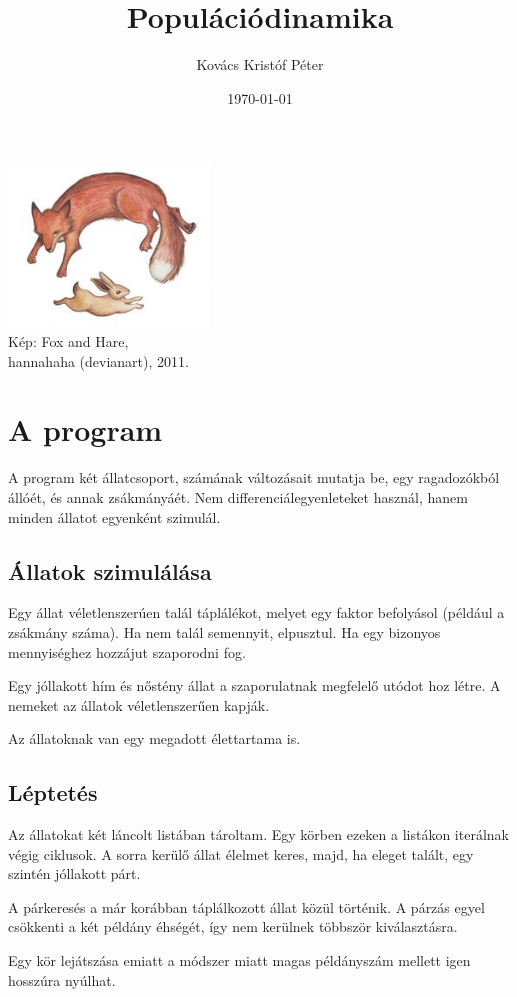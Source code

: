 \documentclass[twoside]{article}
\title{Populációdinamika}
\date{\today}
\author{Kovács Kristóf Péter}
\begin{document}
	
	\maketitle
	\thispagestyle{empty}
	\begin{center}
		\includegraphics[width = 0.4\textwidth]{fox_n_rabbits}
		\\
		\tiny{Kép: Fox and Hare,
		\\hannahaha (devianart), 2011.}
	\end{center}
	\pagebreak
	\section*{A program}
		A program két állatcsoport, számának változásait mutatja be, egy ragadozókból állóét, és annak zsákmányáét. Nem differenciálegyenleteket használ, hanem minden állatot egyenként szimulál.
		\subsection*{Állatok szimulálása}
			Egy állat véletlenszerúen talál táplálékot, melyet egy faktor befolyásol (például a zsákmány száma). Ha nem talál semennyit, elpusztul. Ha egy bizonyos mennyiséghez hozzájut szaporodni fog.
			\par Egy jóllakott hím és nőstény állat a szaporulatnak megfelelő utódot hoz létre. A nemeket az állatok véletlenszerűen kapják.
			\par Az állatoknak van egy megadott élettartama is.
		\subsection*{Léptetés}
			Az állatokat két láncolt listában tároltam. Egy körben ezeken a listákon iterálnak végig ciklusok. A sorra kerülő állat élelmet keres, majd, ha eleget talált, egy szintén jóllakott párt.
			\par A párkeresés a már korábban táplálkozott állat közül történik. A párzás egyel csökkenti a két példány éhségét, így nem kerülnek többször kiválasztásra.
			\par Egy kör lejátszása emiatt a módszer miatt magas példányszám mellett igen hosszúra nyúlhat.
		
\end{document}
